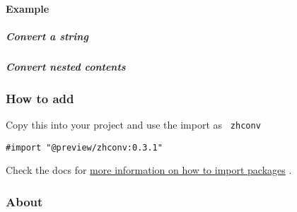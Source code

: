 \paragraph{Example}\label{example}

\subparagraph{Convert a string}\label{convert-a-string}

\begin{Shaded}
\begin{Highlighting}[]
\end{Highlighting}
\end{Shaded}

\subparagraph{Convert nested contents}\label{convert-nested-contents}

\begin{Shaded}
\begin{Highlighting}[]
\NormalTok{\#zhconv([}

\NormalTok{], "zh{-}hans")}
\end{Highlighting}
\end{Shaded}

\subsubsection{How to add}\label{how-to-add}

Copy this into your project and use the import as \texttt{\ zhconv\ }

\begin{verbatim}
#import "@preview/zhconv:0.3.1"
\end{verbatim}



Check the docs for
\href{https://typst.app/docs/reference/scripting/\#packages}{more
information on how to import packages} .

\subsubsection{About}\label{about}

